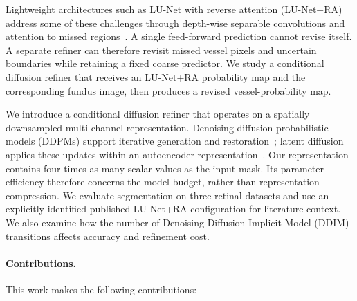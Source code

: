 \documentclass[jimaging,article,submit,pdftex,moreauthors]{Definitions/mdpi}%
\begin{document}
Lightweight architectures such as LU-Net with reverse attention (LU-Net+RA) address some of these challenges through depth-wise separable convolutions and attention to missed regions~\cite{Hernandez2025}. A single feed-forward prediction cannot revise itself. A separate refiner can therefore revisit missed vessel pixels and uncertain boundaries while retaining a fixed coarse predictor. We study a conditional diffusion refiner that receives an LU-Net+RA probability map and the corresponding fundus image, then produces a revised vessel-probability map.



We introduce a conditional diffusion refiner that operates on a spatially downsampled multi-channel representation. Denoising diffusion probabilistic models (DDPMs) support iterative generation and restoration~\cite{Ho2020,Dhariwal2021}; latent diffusion applies these updates within an autoencoder representation~\cite{Rombach2022}. Our representation contains four times as many scalar values as the input mask. Its parameter efficiency therefore concerns the model budget, rather than representation compression. We evaluate segmentation on three retinal datasets and use an explicitly identified published LU-Net+RA configuration for literature context. We also examine how the number of Denoising Diffusion Implicit Model (DDIM) transitions affects accuracy and refinement cost.



\paragraph{Contributions.}

This work makes the following contributions:
\end{document}
